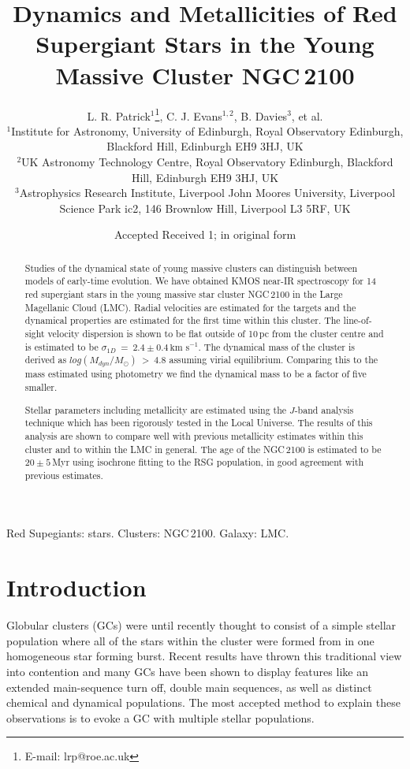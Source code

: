 \documentclass[useAMS,usenatbib]{mn2e}
\title[Dynamics and Metallicities in NGC\,2100]{Dynamics and Metallicities of Red Supergiant Stars in the Young Massive Cluster NGC\,2100}
\author[L. R. Patrick et al.]{L. R. Patrick$^{1}$\thanks{E-mail: lrp@roe.ac.uk}, C. J. Evans$^{1, 2}$, B. Davies$^{3}$, et al.\\
$^{1}$Institute for Astronomy, University of Edinburgh, Royal Observatory Edinburgh, Blackford Hill, Edinburgh EH9 3HJ, UK\\
$^{2}$UK Astronomy Technology Centre, Royal Observatory Edinburgh, Blackford Hill, Edinburgh EH9 3HJ, UK\\
$^{3}$Astrophysics Research Institute, Liverpool John Moores University, Liverpool Science Park ic2, 146 Brownlow Hill, Liverpool L3 5RF, UK
}
\def\kms{$\mbox{km s}^{-1}$}
\begin{document}
\date{Accepted  Received 1; in original form}

\pagerange{\pageref{firstpage}--\pageref{lastpage}} 

\maketitle

\label{firstpage}

\begin{abstract}
Studies of the dynamical state of young massive clusters can distinguish between models of early-time evolution.
We have obtained KMOS near-IR spectroscopy for 14 red supergiant stars in the young massive star cluster NGC\,2100 in the Large Magellanic Cloud (LMC).
Radial velocities are estimated for the targets and the dynamical properties are estimated for the first time within this cluster.
The line-of-sight velocity dispersion is shown to be flat outside of 10\,pc from the cluster centre and is estimated to be
$\sigma_{1D}~=~2.4\pm0.4\,$\kms.
The dynamical mass of the cluster is derived as
$log(M_{dyn}/M_{\odot})~>~4.8$ assuming virial equilibrium.
Comparing this to the mass estimated using photometry we find the dynamical mass to be a factor of five smaller.

Stellar parameters including metallicity are estimated using the $J$-band analysis technique which has been rigorously tested in the Local Universe.
The results of this analysis are shown to compare well with previous metallicity estimates within this cluster and to within the LMC in general.
The age of the NGC\,2100 is estimated to be $20\pm5\,$Myr using isochrone fitting to the RSG population, in good agreement with previous estimates.

\end{abstract}

\begin{keywords}
Red Supegiants: stars. Clusters: NGC\,2100. Galaxy: LMC.
\end{keywords}

\section{Introduction} %
\label{sec:introduction}

Globular clusters (GCs) were until recently thought to consist of a simple stellar population where all of the stars within the cluster were formed from in one homogeneous star forming burst.
Recent results have thrown this traditional view into contention and many GCs have been shown to display features like an extended main-sequence turn off, double main sequences, as well as distinct chemical and dynamical populations.
The most accepted method to explain these observations is to evoke a GC with multiple stellar populations.
\end{document}
